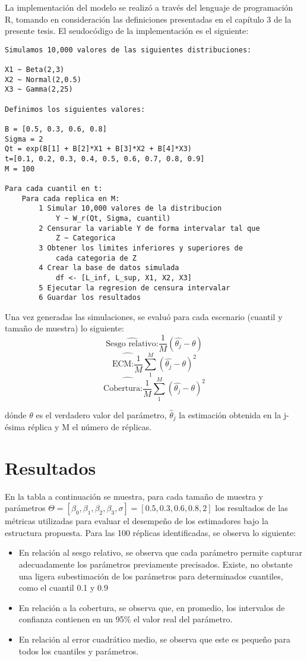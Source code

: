 La implementación del modelo se realizó a través del lenguaje de programación R, tomando en consideración las definiciones presentadas en el capítulo 3 de la presente tesis. El seudocódigo de la implementación es el siguiente:

\begin{lstlisting}
Simulamos 10,000 valores de las siguientes distribuciones:

X1 ~ Beta(2,3) 
X2 ~ Normal(2,0.5)
X3 ~ Gamma(2,25)

Definimos los siguientes valores:

B = [0.5, 0.3, 0.6, 0.8] 
Sigma = 2
Qt = exp(B[1] + B[2]*X1 + B[3]*X2 + B[4]*X3)
t=[0.1, 0.2, 0.3, 0.4, 0.5, 0.6, 0.7, 0.8, 0.9]
M = 100

Para cada cuantil en t:
	Para cada replica en M:
		1 Simular 10,000 valores de la distribucion 
			Y ~ W_r(Qt, Sigma, cuantil)
		2 Censurar la variable Y de forma intervalar tal que
			Z ~ Categorica
		3 Obtener los limites inferiores y superiores de
			cada categoria de Z
		4 Crear la base de datos simulada
			df <- [L_inf, L_sup, X1, X2, X3]
		5 Ejecutar la regresion de censura intervalar
		6 Guardar los resultados
\end{lstlisting}


Una vez generadas las simulaciones, se evaluó para cada escenario (cuantil y tamaño de muestra) lo siguiente:
\[ \hat{\text{Sesgo relativo:}} \frac{1}{M}(\hat{\theta_j} - \theta)\]
\[ \hat{\text{ECM:} \frac{1}{M}} \sum_1^M (\hat{\theta_j} - \theta)^2 \]
\[ \hat{\text{Cobertura:} \frac{1}{M}} \sum_1^M (\hat{\theta_j} - \theta)^2 \]

\noindent dónde $\theta$ es el verdadero valor del parámetro, $\hat{\theta}_{j}$ la estimación obtenida en la j-ésima réplica y M el número de réplicas.

\section{Resultados}

En la tabla a continuación se muestra, para cada tamaño de muestra y parámetros $\Theta = [\beta_0,\beta_1,\beta_2,\beta_3,\sigma] = [0.5, 0.3, 0.6, 0.8, 2]$ los resultados de las métricas utilizadas para evaluar el desempeño de los estimadores bajo la estructura propuesta. Para las 100 réplicas identificadas, se observa lo siguiente:

\begin{itemize}
	\item En relación al sesgo relativo, se observa que cada parámetro permite capturar adecuadamente los parámetros previamente precisados. Existe, no obstante una ligera subestimación de los parámetros para determinados cuantiles, como el cuantil 0.1 y 0.9
	\item En relación a la cobertura, se observa que, en promedio, los intervalos de confianza contienen en un 95\% el valor real del parámetro.
	\item En relación al error cuadrático medio, se observa que este es pequeño para todos los cuantiles y parámetros.
\end{itemize}

